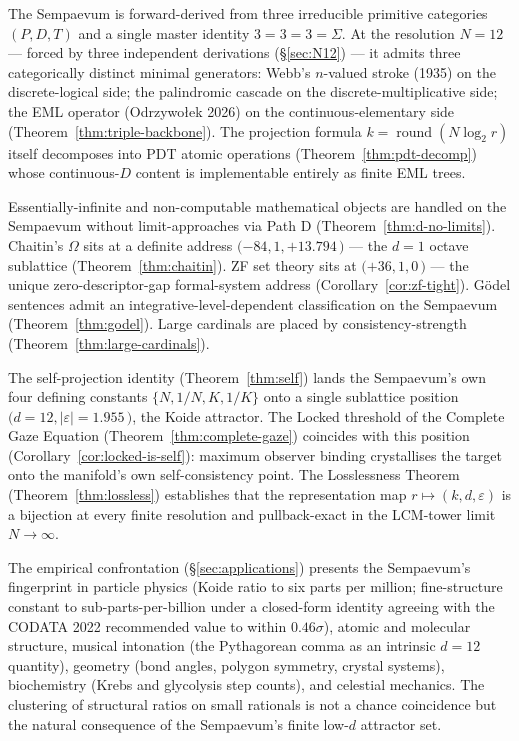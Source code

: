 \documentclass[11pt,a4paper]{article}
\theoremstyle{definition}
\theoremstyle{remark}
\DeclareMathOperator{\round}{round}
\begin{document}
The Sempaevum is forward-derived from three irreducible primitive categories $(P,D,T)$ and a single master identity $3=3=3=\Sigma$. At the resolution $N=12$ --- forced by three independent derivations (\S\ref{sec:N12}) --- it admits three categorically distinct minimal generators: Webb's $n$-valued stroke (1935) on the discrete-logical side; the palindromic cascade on the discrete-multiplicative side; the EML operator (Odrzywo{\l}ek 2026) on the continuous-elementary side (Theorem~\ref{thm:triple-backbone}). The projection formula $k=\round(N\log_{2}r)$ itself decomposes into PDT atomic operations (Theorem~\ref{thm:pdt-decomp}) whose continuous-$D$ content is implementable entirely as finite EML trees.

Essentially-infinite and non-computable mathematical objects are handled on the Sempaevum without limit-approaches via Path D (Theorem~\ref{thm:d-no-limits}). Chaitin's $\Omega$ sits at a definite address $(-84, 1, +13.794$\,\textcent$)$ --- the $d=1$ octave sublattice (Theorem~\ref{thm:chaitin}). ZF set theory sits at $(+36, 1, 0$\,\textcent$)$ --- the unique zero-descriptor-gap formal-system address (Corollary~\ref{cor:zf-tight}). G\"odel sentences admit an integrative-level-dependent classification on the Sempaevum (Theorem~\ref{thm:godel}). Large cardinals are placed by consistency-strength (Theorem~\ref{thm:large-cardinals}).

The self-projection identity (Theorem~\ref{thm:self}) lands the Sempaevum's own four defining constants $\{N, 1/N, K, 1/K\}$ onto a single sublattice position $(d=12, |\varepsilon|=1.955$\,\textcent$)$, the Koide attractor. The Locked threshold of the Complete Gaze Equation (Theorem~\ref{thm:complete-gaze}) coincides with this position (Corollary~\ref{cor:locked-is-self}): maximum observer binding crystallises the target onto the manifold's own self-consistency point. The Losslessness Theorem (Theorem~\ref{thm:lossless}) establishes that the representation map $r\mapsto(k,d,\varepsilon)$ is a bijection at every finite resolution and pullback-exact in the LCM-tower limit $N\to\infty$.

The empirical confrontation (\S\ref{sec:applications}) presents the Sempaevum's fingerprint in particle physics (Koide ratio to six parts per million; fine-structure constant to sub-parts-per-billion under a closed-form identity agreeing with the CODATA 2022 recommended value to within $0.46\sigma$), atomic and molecular structure, musical intonation (the Pythagorean comma as an intrinsic $d=12$ quantity), geometry (bond angles, polygon symmetry, crystal systems), biochemistry (Krebs and glycolysis step counts), and celestial mechanics. The clustering of structural ratios on small rationals is not a chance coincidence but the natural consequence of the Sempaevum's finite low-$d$ attractor set.
\end{document}
